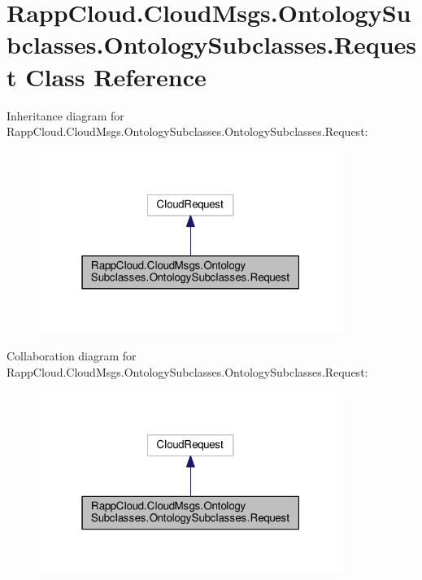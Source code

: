 \hypertarget{classRappCloud_1_1CloudMsgs_1_1OntologySubclasses_1_1OntologySubclasses_1_1Request}{\section{Rapp\-Cloud.\-Cloud\-Msgs.\-Ontology\-Subclasses.\-Ontology\-Subclasses.\-Request Class Reference}
\label{classRappCloud_1_1CloudMsgs_1_1OntologySubclasses_1_1OntologySubclasses_1_1Request}
}


Inheritance diagram for Rapp\-Cloud.\-Cloud\-Msgs.\-Ontology\-Subclasses.\-Ontology\-Subclasses.\-Request\-:
\nopagebreak
\begin{figure}[H]
\begin{center}
\leavevmode
\includegraphics[width=280pt]{classRappCloud_1_1CloudMsgs_1_1OntologySubclasses_1_1OntologySubclasses_1_1Request__inherit__graph}
\end{center}
\end{figure}


Collaboration diagram for Rapp\-Cloud.\-Cloud\-Msgs.\-Ontology\-Subclasses.\-Ontology\-Subclasses.\-Request\-:
\nopagebreak
\begin{figure}[H]
\begin{center}
\leavevmode
\includegraphics[width=280pt]{classRappCloud_1_1CloudMsgs_1_1OntologySubclasses_1_1OntologySubclasses_1_1Request__coll__graph}
\end{center}
\end{figure}
